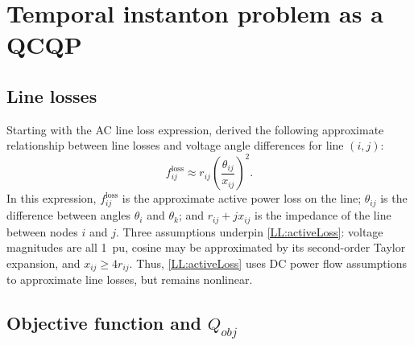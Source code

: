 \documentclass[conference]{IEEEtran}
\begin{document}

\section{Temporal instanton problem as a QCQP}\label{sec:qcqp}

\subsection{Line losses}\label{sec:line-losses}

Starting with the AC line loss expression, \cite{almassalkhi2014}
derived the following approximate relationship between line losses and
voltage angle differences for line $(i,j)$:
\begin{equation}
\label{LL:activeLoss}
f_{ij}^{\text{loss}} \approx r_{ij}\left(\frac{\theta_{ij}}{x_{ij}}\right)^2.
\end{equation}
In this expression, $f_{ij}^{\text{loss}}$ is the approximate active
power loss on the line; $\theta_{ij}$ is the difference between angles
$\theta_i$ and $\theta_k$; and $r_{ij} +j x_{ij}$ is the impedance of
the line between nodes $i$ and $j$. Three assumptions underpin
\eqref{LL:activeLoss}: voltage magnitudes are all 1~pu, cosine may be
approximated by its second-order Taylor expansion, and $x_{ij} \geq
4r_{ij}$. Thus, \eqref{LL:activeLoss} uses DC power flow assumptions
to approximate line losses, but remains nonlinear.

\subsection{Objective function and $Q_{obj}$}\label{sec:Qobj}
\end{document}
